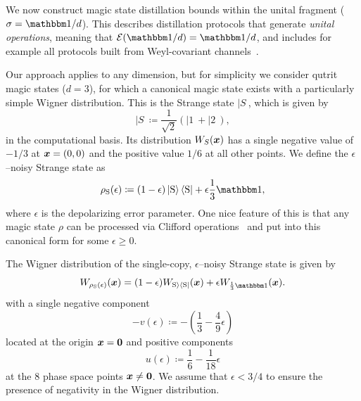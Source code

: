 \documentclass[pra,
aps,
twocolumn,
superscriptaddress,
groupedaddress,
nofootinbib,
reprint
]{revtex4-1}
\begin{document}
We now construct magic state distillation bounds within the unital fragment ($\sigma = \I/d$). This describes distillation protocols that generate \emph{unital operations}, meaning that $\E(\I/d) = \I/d$, and includes for example all protocols built from Weyl-covariant channels~\cite{cit:gross3}. 

Our approach applies to any dimension, but for simplicity we consider qutrit magic states ($d=3$), for which a canonical magic state exists with a particularly simple Wigner distribution. This is the Strange state $|S\>$, which is given by
\begin{equation}
|S\> \coloneqq \frac{1}{\sqrt{2}} (|1\> + |2\>),
\end{equation}
in the computational basis. Its distribution $W_S(\boldsymbol{x})$ has a single negative value of $-1/3$ at $\boldsymbol{x} =(0,0)$ and the positive value $1/6$ at all other points. We define the $\epsilon$--noisy Strange state as
\begin{equation}\label{eq:noisysn}
    \rho_{\rm{S}}(\epsilon)\coloneqq (1 - \epsilon) \ket{\rm{S}}\bra{\rm{S}} + \epsilon \frac{1}{3}\id,
\end{equation}
where $\epsilon$ is the depolarizing error parameter. One nice feature of this is that any magic state $\rho$ can be processed via Clifford operations~\cite{cit:prakash,cit:prakash2} and put into this canonical form for some $\epsilon \ge 0$.

The Wigner distribution of the single-copy, $\epsilon$--noisy Strange state  is given by
\begin{equation}
	\W[\bmx]{\rho_{\rm{S}}(\epsilon)} = (1-\epsilon)\W[\bmx]{\rm{S}\>\<\rm{S}|} + \epsilon\W[\bmx]{\frac{1}{3}\id}.
\end{equation}
with a single negative component
\begin{equation}
	- v(\epsilon) \coloneqq - \left( \frac{1}{3} -\frac{4}{9}\epsilon \right)
\end{equation} 
located at the origin $\bm{x} = \bm{0}$ and positive components
\begin{equation}
	u(\epsilon) \coloneqq \frac{1}{6} -\frac{1}{18}\epsilon
\end{equation}
at the 8 phase space points $\boldsymbol{x} \ne \mathbf{0}$. We assume that $\epsilon < 3/4$ to ensure the presence of negativity in the Wigner distribution. 
\end{document}
